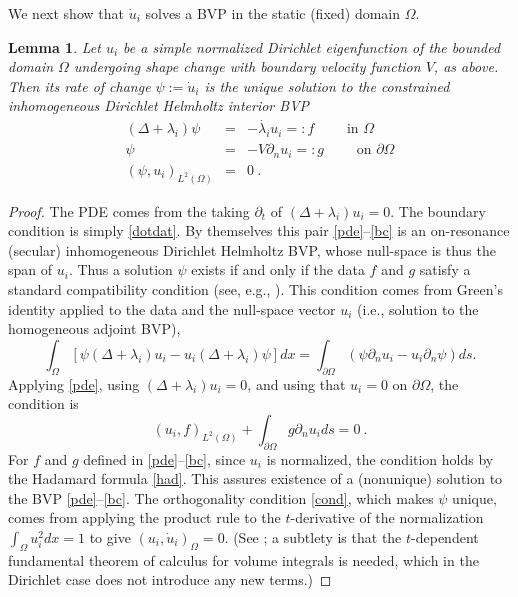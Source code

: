 \documentclass{amsart}
\newcommand{\bea}{\begin{eqnarray}}
\newcommand{\eea}{\end{eqnarray}}
\newcommand{\pO}{{\partial\Omega}}
\newcommand{\dn}{{\partial_n}}
\theoremstyle{plain}
\newtheorem{lemma}[theorem]{Lemma}
\begin{document}
We next show that $\dot u_i$ solves a BVP in the static (fixed)
domain $\Omega$.

\begin{lemma}  %
  Let $u_i$ be a simple normalized Dirichlet eigenfunction of
  the bounded domain $\Omega$ undergoing shape change with boundary velocity
  function $V$, as above.
  Then its rate of change $\psi:= \dot u_i$ is the unique
  solution to the constrained 
  inhomogeneous Dirichlet Helmholtz interior BVP
  \bea
  (\Delta + \lambda_i)\psi &=& -\dot{\lambda_i} u_i =: f \qquad\mbox{ in } \Omega
  \label{pde}
  \\
  \psi &=& -V \dn u_i =: g \qquad\mbox{ on } \pO
  \label{bc}
  \\
  (\psi,u_i)_{L^2(\Omega)} &=& 0 ~.
  \label{cond}
  \eea
  \label{l:bvp}
\end{lemma}
\begin{proof}
  The PDE comes from the taking $\partial_t$ of
  $(\Delta+\lambda_i)u_i = 0$.
  The boundary condition is simply \eqref{dotdat}.
  By themselves this pair \eqref{pde}--\eqref{bc} is an on-resonance
  (secular)
  inhomogeneous Dirichlet Helmholtz BVP, whose null-space is thus the span of
  $u_i$.
  Thus a solution $\psi$ exists if and only if the data $f$ and $g$ satisfy
  a standard compatibility condition
  (see, e.g., \cite[Thm.~4.10]{mclean2000strongly}).
  This condition comes from Green's identity
  applied to the data and the null-space vector $u_i$ (i.e., solution to
  the homogeneous adjoint BVP),
  $$
  \int_\Omega [\psi (\Delta + \lambda_i)u_i - u_i (\Delta + \lambda_i) \psi]
  dx
  = \int_\pO (\psi \dn u_i - u_i \dn \psi) ds.
  $$
  Applying \eqref{pde}, using
  $(\Delta+\lambda_i)u_i = 0$, and using that $u_i=0$ on $\pO$,
  the condition is
  $$
  (u_i, f)_{L^2(\Omega)} + \int_\pO g \dn u_i ds = 0~.
  $$
  For $f$ and $g$ defined in \eqref{pde}--\eqref{bc},
  since $u_i$ is normalized,
  the condition holds by the Hadamard formula \eqref{had}.
  This assures existence of a (nonunique) solution to the BVP
  \eqref{pde}--\eqref{bc}.
  The orthogonality condition \eqref{cond}, which makes $\psi$ unique,
  comes from applying the product rule to the $t$-derivative of the normalization $\int_\Omega u_i^2 dx = 1$
  to give $(u_i,\dot u_i)_\Omega = 0$.
  (See \cite[(68)]{grin10}; a subtlety is that the $t$-dependent
  fundamental theorem of calculus for volume integrals is needed, which
  in the Dirichlet case
  does not introduce any new terms.)
\end{proof}
\end{document}
